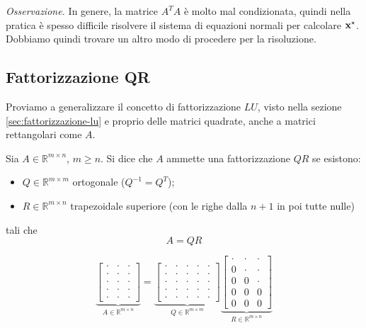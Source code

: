 \textit{Osservazione.} In genere, la matrice $A^{T} A$ è molto mal condizionata, quindi nella pratica è spesso difficile risolvere il sistema di equazioni normali per calcolare $\mathbf{x}^{\star }$. Dobbiamo quindi trovare un altro modo di procedere per la risoluzione.
\subsection{Fattorizzazione QR}
Proviamo a generalizzare il concetto di fattorizzazione $LU$, visto nella sezione \ref{sec:fattorizzazione-lu} e proprio delle matrici quadrate, anche a matrici rettangolari come $A$.
\begin{definition}
[Fattorizzazione $QR$]
Sia $A\in \mathbb{R}^{m\times n}$, $m\geqslant n$.
Si dice che $A$ ammette una fattorizzazione $QR$ se esistono:
\begin{itemize}
\item $Q\in \mathbb{R}^{m\times m}$ ortogonale ($Q^{-1} =Q^{T}$);
\item $R\in \mathbb{R}^{m\times n}$ trapezoidale superiore (con le righe dalla $n+1$ in poi tutte nulle) 
\end{itemize}
tali che $$A=QR$$
\end{definition}
\begin{equation*}
\underbrace{\begin{bmatrix}
\cdot  & \cdot  & \cdot \\
\cdot  & \cdot  & \cdot \\
\cdot  & \cdot  & \cdot \\
\cdot  & \cdot  & \cdot \\
\cdot  & \cdot  & \cdot
\end{bmatrix}}_{A\in \mathbb{R}^{m\times n}} =\underbrace{\begin{bmatrix}
\cdot  & \cdot  & \cdot  & \cdot  & \cdot \\
\cdot  & \cdot  & \cdot  & \cdot  & \cdot \\
\cdot  & \cdot  & \cdot  & \cdot  & \cdot \\
\cdot  & \cdot  & \cdot  & \cdot  & \cdot \\
\cdot  & \cdot  & \cdot  & \cdot  & \cdot
\end{bmatrix}}_{Q\in \mathbb{R}^{m\times m}}\underbrace{\begin{bmatrix}
\cdot  & \cdot  & \cdot \\
0 & \cdot  & \cdot \\
0 & 0 & \cdot \\
0 & 0 & 0\\
0 & 0 & 0
\end{bmatrix}}_{R\in \mathbb{R}^{m\times n}}
\end{equation*}
